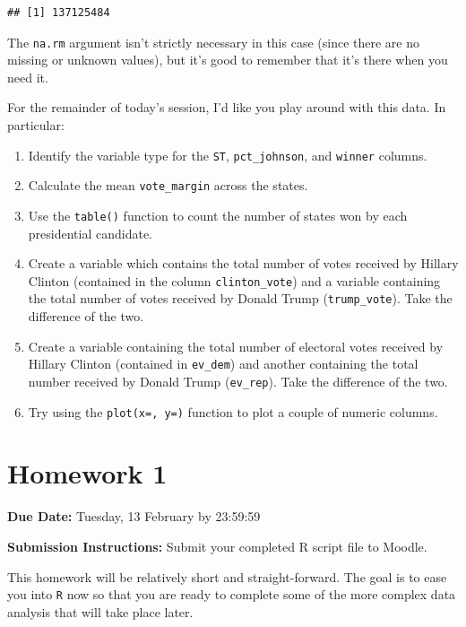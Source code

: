 \documentclass[
]{book}
\providecommand{\tightlist}{%
  \setlength{\itemsep}{0pt}\setlength{\parskip}{0pt}}
\begin{document}
\begin{verbatim}
## [1] 137125484
\end{verbatim}

The \texttt{na.rm} argument isn't strictly necessary in this case (since there are no missing or unknown values), but it's good to remember that it's there when you need it.

For the remainder of today's session, I'd like you play around with this data. In particular:

\begin{enumerate}
\def\labelenumi{\arabic{enumi}.}
\tightlist
\item
  Identify the variable type for the \texttt{ST}, \texttt{pct\_johnson}, and \texttt{winner} columns.
\item
  Calculate the mean \texttt{vote\_margin} across the states.
\item
  Use the \texttt{table()} function to count the number of states won by each presidential candidate.
\item
  Create a variable which contains the total number of votes received by Hillary Clinton (contained in the column \texttt{clinton\_vote}) and a variable containing the total number of votes received by Donald Trump (\texttt{trump\_vote}). Take the difference of the two.
\item
  Create a variable containing the total number of electoral votes received by Hillary Clinton (contained in \texttt{ev\_dem}) and another containing the total number received by Donald Trump (\texttt{ev\_rep}). Take the difference of the two.
\item
  Try using the \texttt{plot(x=,\ y=)} function to plot a couple of numeric columns.
\end{enumerate}

\hypertarget{homework-1}{%
\chapter*{Homework 1}\label{homework-1}}

\textbf{Due Date:} Tuesday, 13 February by 23:59:59

\textbf{Submission Instructions:} Submit your completed R script file to Moodle.

This homework will be relatively short and straight-forward. The goal is to ease you into \texttt{R} now so that you are ready to complete some of the more complex data analysis that will take place later.
\end{document}
